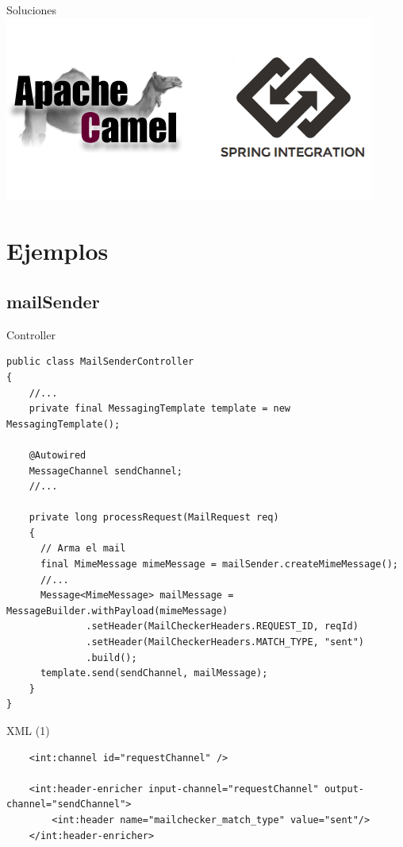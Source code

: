 \documentclass{beamer}
\begin{document}
\begin{frame}{Soluciones}
\includegraphics[width= 0.9\linewidth]{camel-spring}
\end{frame}

\section{Ejemplos}
\subsection{mailSender}
\begin{frame}[fragile]{Controller}
\lstset{language=Java, basicstyle=\ttfamily\tiny}
\begin{lstlisting}
public class MailSenderController
{
    //...
    private final MessagingTemplate template = new MessagingTemplate();

    @Autowired
    MessageChannel sendChannel;
    //...
    
    private long processRequest(MailRequest req)
    {
      // Arma el mail
      final MimeMessage mimeMessage = mailSender.createMimeMessage();
      //...
      Message<MimeMessage> mailMessage = MessageBuilder.withPayload(mimeMessage)
              .setHeader(MailCheckerHeaders.REQUEST_ID, reqId)
              .setHeader(MailCheckerHeaders.MATCH_TYPE, "sent")
              .build();
      template.send(sendChannel, mailMessage);      
    }
}
\end{lstlisting}
\end{frame}

\begin{frame}[fragile]{XML (1)}
\lstset{language=XML,  basicstyle=\tiny}
\begin{lstlisting}
    <int:channel id="requestChannel" />

    <int:header-enricher input-channel="requestChannel" output-channel="sendChannel">
        <int:header name="mailchecker_match_type" value="sent"/>
    </int:header-enricher>
\end{lstlisting}
\end{frame}
\end{document}
